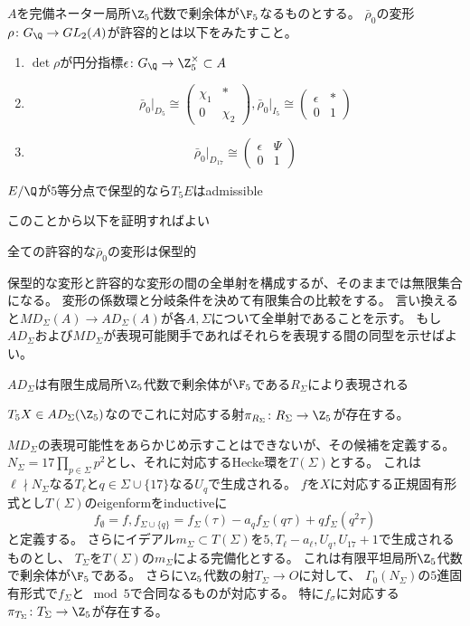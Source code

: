 \documentclass{jsarticle}
\begin{document}
\begin{dfn}
$A$を完備ネーター局所$\Z_5$代数で剰余体が$\F_5$なるものとする。
$\bar{\rho}_0$の変形$\rho\colon G_\Q\to GL_2(A)$が許容的とは以下をみたすこと。
\begin{enumerate}
\item $\det{\rho}$が円分指標$\epsilon\colon G_\Q\to\Z_5^\times\subset A$
\item 
\[
\bar{\rho}_0\vert_{D_5}\cong\begin{pmatrix}\chi_1&*\\0&\chi_2\end{pmatrix},
\bar{\rho}_0\vert_{I_5}\cong\begin{pmatrix}\epsilon&*\\0&1\end{pmatrix}
\]
\item 
\[
\bar{\rho}_0\vert_{D_{17}}\cong\begin{pmatrix}\epsilon&\Psi\\0&1\end{pmatrix}
\]
\end{enumerate}
\end{dfn}
\begin{prop}
$E/\Q$が$5$等分点で保型的なら$T_5E$はadmissible
\end{prop}
このことから以下を証明すればよい
\begin{thm}
全ての許容的な$\bar{\rho}_0$の変形は保型的
\end{thm}
保型的な変形と許容的な変形の間の全単射を構成するが、そのままでは無限集合になる。
変形の係数環と分岐条件を決めて有限集合の比較をする。
言い換えると$MD_\Sigma(A)\to AD_\Sigma(A)$が各$A, \Sigma$について全単射であることを示す。
もし$AD_\Sigma$および$MD_\Sigma$が表現可能関手であればそれらを表現する間の同型を示せばよい。
\begin{thm}[Mazur]
$AD_\Sigma$は有限生成局所$\Z_5$代数で剰余体が$\F_5$である$R_\Sigma$により表現される
\end{thm}
$T_5X\in AD_\Sigma(\Z_5)$なのでこれに対応する射$\pi_{R_\Sigma}\colon R_\Sigma\to \Z_5$が存在する。

$MD_\Sigma$の表現可能性をあらかじめ示すことはできないが、その候補を定義する。
$N_\Sigma=17\prod_{p\in\Sigma}p^2$とし、それに対応するHecke環を$T(\Sigma)$とする。
これは$\ell\nmid N_\Sigma$なる$T_\ell$と$q\in\Sigma\cup\{17\}$なる$U_q$で生成される。
$f$を$X$に対応する正規固有形式とし$T(\Sigma)$のeigenformをinductiveに
\[
f_\emptyset=f, f_{\Sigma\cup\{q\}}=f_\Sigma(\tau)-a_qf_\Sigma(q\tau)+qf_\Sigma(q^2\tau)
\]
と定義する。
さらにイデアル$m_\Sigma\subset T(\Sigma)$を$5,T_\ell-a_\ell, U_q, U_{17}+1$で生成されるものとし、
$T_\Sigma$を$T(\Sigma)$の$m_\Sigma$による完備化とする。
これは有限平坦局所$\Z_5$代数で剰余体が$\F_5$である。
さらに$\Z_5$代数の射$T_\Sigma\to O$に対して、
$\Gamma_0(N_\Sigma)$の$5$進固有形式で$f_\Sigma$と$\mod 5$で合同なるものが対応する。
特に$f_\sigma$に対応する$\pi_{T_\Sigma}\colon T_\Sigma\to \Z_5$が存在する。
\begin{thm}
\end{thm}
\end{document}
